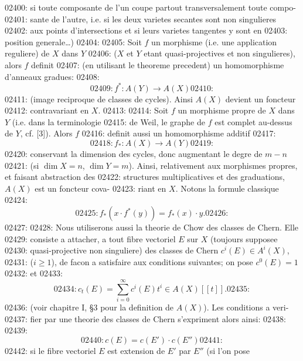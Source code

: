 02400: si toute composante de l'un coupe partout transversalement toute compo-
02401: sante de l'autre, i.e. si les deux varietes secantes sont non singulieres
02402: aux points d'intersections et si leurs varietes tangentes y sont en
02403: position generale\ldots)
02404: 
02405: Soit $f$ un morphisme (i.e. une application reguliere) de $X$ dans $Y$
02406: ($X$ et $Y$ etant quasi-projectives et non singulieres), alors $f$ definit
02407: (en utilisant le theoreme precedent) un homomorphisme d'anneaux gradues:
02408: \begin{equation}
02409: f^{*}: A(Y) \longrightarrow A(X)
02410: \end{equation}
02411: (image reciproque de classes de cycles). Ainsi $A(X)$ devient un foncteur
02412: contravariant en $X$.
02413: 
02414: Soit $f$ un morphisme propre de $X$ dans $Y$ (i.e. dans la terminologie
02415: de Weil, le graphe de $f$ est complet au-dessus de $Y$, cf. [3]). Alors $f$
02416: definit aussi un homomorphisme additif
02417: \begin{equation}
02418: f_{*}: A(X) \longrightarrow A(Y)
02419: \end{equation}
02420: conservant la dimension des cycles, donc augmentant le degre de $m - n$
02421: (si $\dim X = n$, $\dim Y = m$). Ainsi, relativement aux morphismes propres, et faisant abstraction des
02422: structures multiplicatives et des graduations, $A(X)$ est un foncteur cova-
02423: riant en $X$. Notons la formule classique
02424: \begin{equation}
02425: f_{*}(x \cdot f^{*}(y)) = f_{*}(x) \cdot y.
02426: \end{equation}
02427: 
02428: Nous utiliserons aussi la theorie de Chow des classes de Chern. Elle
02429: consiste a attacher, a tout fibre vectoriel $E$ sur $X$ (toujours supposee
02430: quasi-projective non singuliere) des classes de Chern $c^i(E) \in A^i(X)$,
02431: ($i \geq 1$), de facon a satisfaire aux conditions suivantes; on pose $c^0(E) = 1$
02432: et
02433: \begin{equation}
02434: c_t(E) = \sum_{i=0}^{\infty} c^i(E) t^i \in A(X)[[t]].
02435: \end{equation}
02436: (voir chapitre I, \S 3 pour la definition de $A(X)$). Les conditions a veri-
02437: fier par une theorie des classes de Chern s'expriment alors ainsi:
02438: 
02439: \begin{equation}
02440: c(E) = c(E') \cdot c(E'')
02441: \end{equation}
02442: si le fibre vectoriel $E$ est extension de $E'$ par $E''$ (si l'on pose
